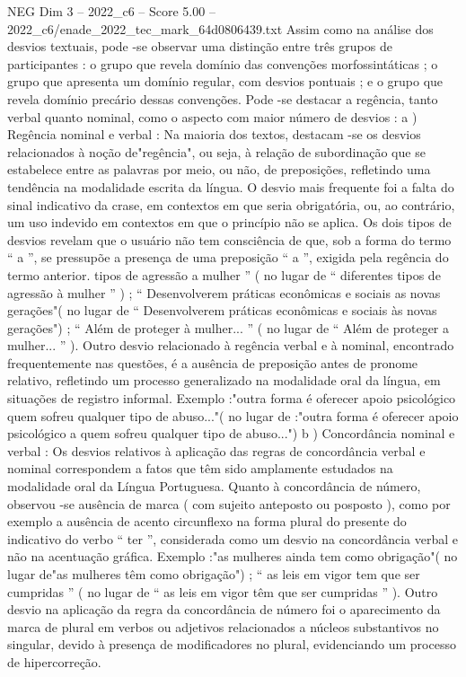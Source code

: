 \begin{textsample}{NEG Dim 3 – 2022\_c6 – Score 5.00 – 2022\_c6/enade\_2022\_tec\_mark\_64d0806439.txt}
Assim como na análise dos desvios textuais, pode -se observar uma distinção entre três grupos de participantes : o grupo que revela domínio das convenções morfossintáticas ; o grupo que apresenta um domínio regular, com desvios pontuais ; e o grupo que revela domínio precário dessas convenções.
Pode -se destacar a regência, tanto verbal quanto nominal, como o aspecto com maior número de desvios : a ) Regência nominal e verbal : Na maioria dos textos, destacam -se os desvios relacionados à noção de"regência", ou seja, à relação de subordinação que se estabelece entre as palavras por meio, ou não, de preposições, refletindo uma tendência na modalidade escrita da língua.
O desvio mais frequente foi a falta do sinal indicativo da crase, em contextos em que seria obrigatória, ou, ao contrário, um uso indevido em contextos em que o princípio não se aplica.
Os dois tipos de desvios revelam que o usuário não tem consciência de que, sob a forma do termo “ a ”, se pressupõe a presença de uma preposição “ a ”, exigida pela regência do termo anterior. tipos de agressão a mulher ” ( no lugar de “ diferentes tipos de agressão à mulher ” ) ; “ Desenvolverem práticas econômicas e sociais as novas gerações"( no lugar de “ Desenvolverem práticas econômicas e sociais às novas gerações") ; “ Além de proteger à mulher... ” ( no lugar de “ Além de proteger a mulher... ” ).
Outro desvio relacionado à regência verbal e à nominal, encontrado frequentemente nas questões, é a ausência de preposição antes de pronome relativo, refletindo um processo generalizado na modalidade oral da língua, em situações de registro informal.
Exemplo :"outra forma é oferecer apoio psicológico quem sofreu qualquer tipo de abuso..."( no lugar de :"outra forma é oferecer apoio psicológico a quem sofreu qualquer tipo de abuso...") b ) Concordância nominal e verbal : Os desvios relativos à aplicação das regras de concordância verbal e nominal correspondem a fatos que têm sido amplamente estudados na modalidade oral da Língua Portuguesa.
Quanto à concordância de número, observou -se ausência de marca ( com sujeito anteposto ou posposto ), como por exemplo a ausência de acento circunflexo na forma plural do presente do indicativo do verbo “ ter ”, considerada como um desvio na concordância verbal e não na acentuação gráfica.
Exemplo :"as mulheres ainda tem como obrigação"( no lugar de"as mulheres têm como obrigação") ; “ as leis em vigor tem que ser cumpridas ” ( no lugar de “ as leis em vigor têm que ser cumpridas ” ).
Outro desvio na aplicação da regra da concordância de número foi o aparecimento da marca de plural em verbos ou adjetivos relacionados a núcleos substantivos no singular, devido à presença de modificadores no plural, evidenciando um processo de hipercorreção.

\end{textsample}
